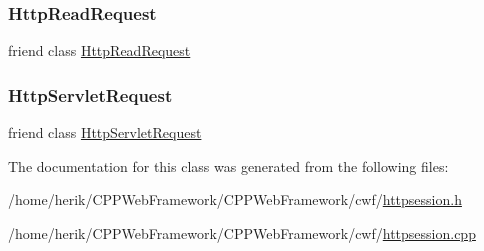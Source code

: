\subsubsection{\texorpdfstring{Http\+Read\+Request}{HttpReadRequest}}
{\footnotesize\ttfamily friend class \hyperlink{class_http_read_request}{Http\+Read\+Request}\hspace{0.3cm}{\ttfamily [friend]}}

\mbox{\label{class_http_session_aebfae296d1cbb22eed705b7950266081}} 
\subsubsection{\texorpdfstring{Http\+Servlet\+Request}{HttpServletRequest}}
{\footnotesize\ttfamily friend class \hyperlink{class_http_servlet_request}{Http\+Servlet\+Request}\hspace{0.3cm}{\ttfamily [friend]}}



The documentation for this class was generated from the following files\+:\begin{DoxyCompactItemize}
\item 
/home/herik/\+C\+P\+P\+Web\+Framework/\+C\+P\+P\+Web\+Framework/cwf/\hyperlink{httpsession_8h}{httpsession.\+h}\item 
/home/herik/\+C\+P\+P\+Web\+Framework/\+C\+P\+P\+Web\+Framework/cwf/\hyperlink{httpsession_8cpp}{httpsession.\+cpp}\end{DoxyCompactItemize}
